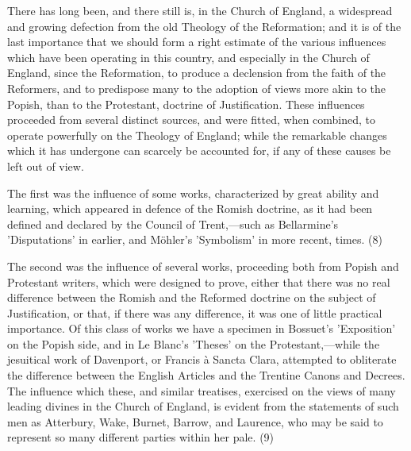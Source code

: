 \documentclass[
]{book}
\begin{document}
There has long been, and there still is, in the Church of England, a widespread and growing defection from the old Theology of the Reformation; and it is of the last importance that we should form a right estimate of the various influences which have been operating in this country, and especially in the Church of England, since the Reformation, to produce a declension from the faith of the Reformers, and to predispose many to the adoption of views more akin to the Popish, than to the Protestant, doctrine of Justification. These influences proceeded from several distinct sources, and were fitted, when combined, to operate powerfully on the Theology of England; while the remarkable changes which it has undergone can scarcely be accounted for, if any of these causes be left out of view.

The first was the influence of some works, characterized by great ability and learning, which appeared in defence of the Romish doctrine, as it had been defined and declared by the Council of Trent,---such as Bellarmine's 'Disputations' in earlier, and Möhler's 'Symbolism' in more recent, times. (8)

The second was the influence of several works, proceeding both from Popish and Protestant writers, which were designed to prove, either that there was no real difference between the Romish and the Reformed doctrine on the subject of Justification, or that, if there was any difference, it was one of little practical importance. Of this class of works we have a specimen in Bossuet's 'Exposition' on the Popish side, and in Le Blanc's 'Theses' on the Protestant,---while the jesuitical work of Davenport, or Francis à Sancta Clara, attempted to obliterate the difference between the English Articles and the Trentine Canons and Decrees. The influence which these, and similar treatises, exercised on the views of many leading divines in the Church of England, is evident from the statements of such men as Atterbury, Wake, Burnet, Barrow, and Laurence, who may be said to represent so many different parties within her pale. (9)
\end{document}
